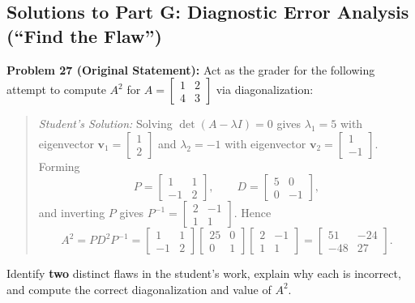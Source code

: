 \documentclass[11pt, letterpaper]{article}
\theoremstyle{definition}
\theoremstyle{remark}
\begin{document}
\subsection{Solutions to Part G: Diagnostic Error Analysis (``Find the Flaw'')}

\textbf{Problem 27 (Original Statement):}
Act as the grader for the following attempt to compute $A^{2}$ for $A = \begin{bmatrix} 1 & 2 \\ 4 & 3 \end{bmatrix}$ via diagonalization:
\begin{quote}
\emph{Student's Solution:} Solving $\det(A - \lambda I) = 0$ gives $\lambda_{1} = 5$ with eigenvector $\mathbf{v}_{1} = \begin{bmatrix} 1 \\ 2 \end{bmatrix}$ and $\lambda_{2} = -1$ with eigenvector $\mathbf{v}_{2} = \begin{bmatrix} 1 \\ -1 \end{bmatrix}$. Forming
\[
P = \begin{bmatrix} 1 & 1 \\ -1 & 2 \end{bmatrix}, \qquad D = \begin{bmatrix} 5 & 0 \\ 0 & -1 \end{bmatrix},
\]
and inverting $P$ gives $P^{-1} = \begin{bmatrix} 2 & -1 \\ 1 & 1 \end{bmatrix}$. Hence
\[
A^{2} = PD^{2}P^{-1} = \begin{bmatrix} 1 & 1 \\ -1 & 2 \end{bmatrix} \begin{bmatrix} 25 & 0 \\ 0 & 1 \end{bmatrix} \begin{bmatrix} 2 & -1 \\ 1 & 1 \end{bmatrix} = \begin{bmatrix} 51 & -24 \\ -48 & 27 \end{bmatrix}.
\]
\end{quote}
Identify \textbf{two} distinct flaws in the student's work, explain why each is incorrect, and compute the correct diagonalization and value of $A^{2}$.
\end{document}
